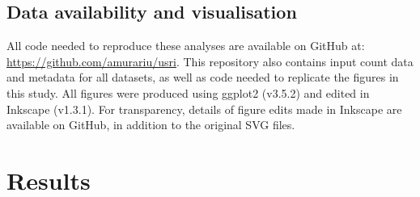 \documentclass[10pt,letterpaper]{article}
\newlength\savedwidth
\newcommand\thickhline{\noalign{\global\savedwidth\arrayrulewidth\global\arrayrulewidth 2pt}%
\hline
\noalign{\global\arrayrulewidth\savedwidth}}
\begin{document}
\subsection*{Data availability and visualisation}
All code needed to reproduce these analyses are available on GitHub at: \url{https://github.com/amurariu/usri}. This repository also contains input count data and metadata for all datasets, as well as code needed to replicate the figures in this study. All figures were produced using ggplot2 (v3.5.2) \cite{wickham_ggplot_2016} and edited in Inkscape (v1.3.1). For transparency, details of figure edits made in Inkscape are available on GitHub, in addition to the original SVG files.





\section*{Results}

\end{document}
